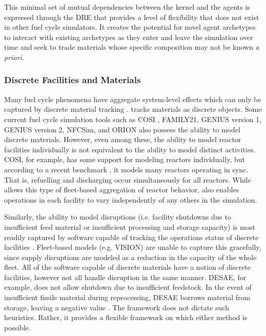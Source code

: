 This minimal set of mutual dependencies between the kernel and the agents is
expressed through the \gls{DRE} that provides a level of flexibility that does
not exist in other fuel cycle simulators.  It creates the potential for novel
agent archetypes to interact with existing archetypes as they enter and leave
the simulation over time and seek to trade materials whose specific
composition may not be known \textit{a priori}.

\subsubsection{Discrete Facilities and Materials}

Many fuel cycle phenomena have aggregate system-level effects which can only be
captured by discrete material tracking \cite{huff_next_2010}.  \Cyclus
tracks materials as discrete objects. Some current fuel cycle simulation tools
such as \gls{COSI}
\cite{mccarthy_benchmark_2012,grasso_nea-wpfc/fcts_2009,guerin_benchmark_2009},
FAMILY21\cite{mccarthy_benchmark_2012},
\gls{GENIUS} version 1, \gls{GENIUS} version 2, \gls{NFCSim}, and ORION also
possess the ability to model discrete materials. However, even among these, the ability to model reactor facilities individually is not equivalent to the ability to model distinct activities. \gls{COSI}, for example,
has some support for modeling reactors individually, but according to a recent
benchmark \cite{boucher_benchmark_2012}, it models many reactors operating in sync. That is, refuelling and discharging occur simultaneously for all reactors.
While \Cyclus allows this type of fleet-based aggregation of reactor behavior, \Cyclus also enables operations in each facility to vary independently of any others in the simulation.

Similarly, the ability to model disruptions (i.e. facility shutdowns due to
insufficient feed material or insufficient processing and storage capacity) is
most readily captured by software capable of tracking the operations status of
discrete facilities \cite{huff_next_2010}.  Fleet-based models (e.g.
\gls{VISION}) are unable to capture this gracefully, since supply disruptions
are modeled as a reduction in the capacity of the whole fleet.  All of the
software capable of discrete materials have a notion of discrete facilities,
however not all handle disruption in the same manner. \gls{DESAE}, for example,
does not allow shutdown due to insufficient feedstock. In the event of
insufficient fissile material during reprocessing, \gls{DESAE} borrows material
from storage, leaving a negative value \cite{mccarthy_benchmark_2012}.  The
\Cyclus framework does not dictate such heuristics. Rather, it provides a
flexible framework on which either method is possible.

